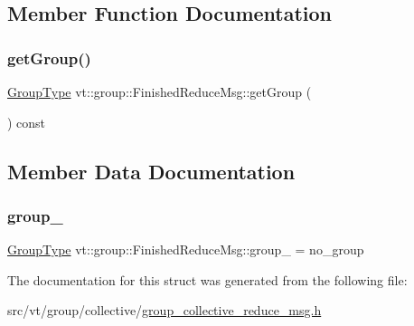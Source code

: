 \subsection{Member Function Documentation}
\mbox{\label{structvt_1_1group_1_1_finished_reduce_msg_af8357b5d9faa6df84ba31746f66ac979}} 
\subsubsection{\texorpdfstring{get\+Group()}{getGroup()}}
{\footnotesize\ttfamily \hyperlink{namespacevt_a27b5e4411c9b6140c49100e050e2f743}{Group\+Type} vt\+::group\+::\+Finished\+Reduce\+Msg\+::get\+Group (\begin{DoxyParamCaption}{ }\end{DoxyParamCaption}) const\hspace{0.3cm}{\ttfamily [inline]}}



\subsection{Member Data Documentation}
\mbox{\label{structvt_1_1group_1_1_finished_reduce_msg_abb883384574d4ace6af3eecd90587c8c}} 
\subsubsection{\texorpdfstring{group\+\_\+}{group\_}}
{\footnotesize\ttfamily \hyperlink{namespacevt_a27b5e4411c9b6140c49100e050e2f743}{Group\+Type} vt\+::group\+::\+Finished\+Reduce\+Msg\+::group\+\_\+ = no\+\_\+group\hspace{0.3cm}{\ttfamily [private]}}



The documentation for this struct was generated from the following file\+:\begin{DoxyCompactItemize}
\item 
src/vt/group/collective/\hyperlink{group__collective__reduce__msg_8h}{group\+\_\+collective\+\_\+reduce\+\_\+msg.\+h}\end{DoxyCompactItemize}
